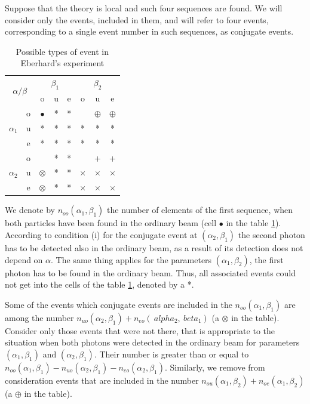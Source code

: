 \documentclass[11pt]{article}
\begin{document}
Suppose that the theory is local and such four sequences are found. We will consider only the events, included in them, and will refer to four events, corresponding to a single event number in such sequences, as conjugate events.

\begin{table}
\centering
\begin{tabular}{|c|c|c|c|c|c|c|c|}
\hline 
\multicolumn{2}{|c|}{\multirow{2}{*}{$\alpha / \beta$}}  & \multicolumn{3}{c|}{$\beta_1$} & \multicolumn{3}{c|}{$\beta_2$} \\ 
\cline{3-8}
\multicolumn{2}{|c|}{}  & o & u & e & o & u & e \\ 
\hline 
\multirow{3}{*}{$\alpha_1$} & o & $\bullet$ & * & * &  & $\oplus$ & $\oplus$ \\ 
\cline{2-8}
 & u & * & * & * & * & * & * \\ 
\cline{2-8}
 & e & * & * & * & * & * & * \\ 
\hline 
\multirow{3}{*}{$\alpha_2$} & o &  & * & * &  & + & + \\ 
\cline{2-8}
 & u & $\otimes$ & * & * & $\times$ & $\times$ & $\times$ \\ 
\cline{2-8}
 & e & $\otimes$ & * & * & $\times$ & $\times$ & $\times$ \\ 
\hline 
\end{tabular} 
\caption{Possible types of event in Eberhard's experiment}
\label{tab:Eberhard_table}
\end{table}

We denote by $ n_{oo} (\alpha_1, \beta_1) $ the number of elements of the first sequence, when both particles have been found in the ordinary beam (cell $ \bullet $ in the table \ref{tab:Eberhard_table}). According to condition (i) for the conjugate event at $ (\alpha_2, \beta_1) $ the second photon has to be detected also in the ordinary beam, as a result of its detection does not depend on $ \alpha $. The same thing applies for the parameters $ (\alpha_1, \beta_2) $, the first photon has to be found in the ordinary beam. Thus, all associated events could not get into the cells of the table \ref{tab:Eberhard_table}, denoted by a *.

Some of the events which conjugate events are included in the $ n_{oo} (\alpha_1, \beta_1) $ are among the number $ n_{uo} (\alpha_2, \beta_1) + n_ {eo} (\ alpha_2, \ beta_1) $ (a $ \otimes $ in the table). Consider only those events that were not there, that is appropriate to the situation when both photons were detected in the ordinary beam for parameters $ (\alpha_1, \beta_1) $ and $ (\alpha_2, \beta_1) $. Their number is greater than or equal to $ n_{oo} (\alpha_1, \beta_1) - n_{uo} (\alpha_2, \beta_1) - n_{eo} (\alpha_2, \beta_1) $. Similarly, we remove from consideration events that are included in the number $ n_{ou} (\alpha_1, \beta_2) + n_{oe} (\alpha_1, \beta_2) $ (a $ \oplus $ in the table).
\end{document}
